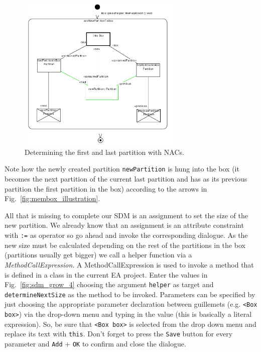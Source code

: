 \begin{figure}[htbp]
\begin{center}
  \includegraphics[width=0.7\textwidth]{pics/sdmBilder/grow/sdm65}
  \caption{Determining the first and last partition with NACs.}  
  \label{fig:sdm_grow_3}
\end{center}
\end{figure}
 
Note how the newly created partition
\texttt{newPartition} is hung into the box (it becomes the next partition of the
current last partition and has as its previous partition the first partition
in the box) according to the arrows in Fig.~\ref{fig:membox_illustration}.
  
All that is missing to complete our SDM is an assignment to set the size of the
new partition.  We already know that an assignment is an attribute
constraint with \texttt{:=} as operator so go ahead and invoke the corresponding
dialogue.  As the new size must be calculated depending on the rest of the
partitions in the box (partitions usually get bigger) we call a helper function
via a \emph{MethodCallExpression}.  A MethodCallExpression is used to invoke a
method that is defined in a class in the current EA project.  Enter the values
in Fig.~\ref{fig:sdm_grow_4} choosing the argument \texttt{helper} as target and
\texttt{determineNextSize} as the method to be invoked.  Parameters can be
specified by just choosing the appropriate parameter declaration between
guillemets (e.g. \texttt{<Box box>}) via the drop-down menu and typing in the
value (this is basically a literal expression). So, be sure that \texttt{<Box box>} is selected
from the drop down menu and replace its text with \texttt{this}. Don't forget to
press the \texttt{Save} button for every parameter and \texttt{Add} 
+ \texttt{OK} to confirm and close the dialogue.
 
